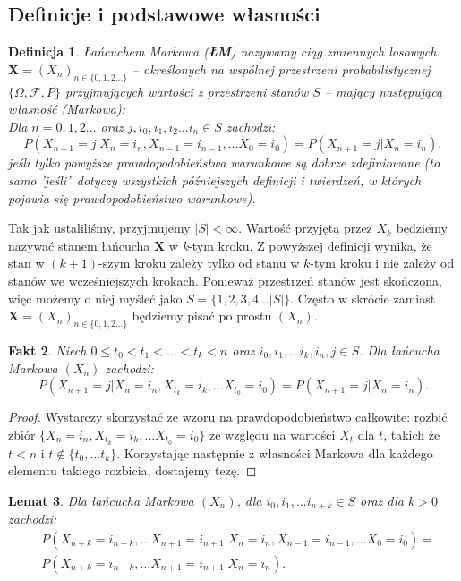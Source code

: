 \documentclass[a4paper]{article}
\theoremstyle{defn}
\newtheorem{defn}{Definicja}[subsection]
\theoremstyle{theorem}
\theoremstyle{lemma}
\newtheorem{lemma}[defn]{Lemat}
\theoremstyle{cor}
\theoremstyle{fact}
\newtheorem{fact}[defn]{Fakt}
\begin{document}
\subsection{Definicje i podstawowe własności}
\label{sect2.1}
\begin{defn}\label{defn2.1.1}
\textit{Łańcuchem Markowa} (\textbf{ŁM}) nazywamy ciąg zmiennych losowych $\boldsymbol{X} = (X_n)_{n \in \{0,1,2...\}}$ – określonych na wspólnej przestrzeni probabilistycznej $\{\Omega, \mathcal{F}, P\}$ przyjmujących wartości z przestrzeni stanów $S$ – mający następującą własność (Markowa):\\
Dla $n = 0, 1, 2...$ oraz $j, i_0, i_1, i_2 ... i_n \in S$ zachodzi: $$P(X_{n+1} = j | X_n = i_n, X_{n-1} = i_{n-1}, ... X_0 = i_0) = P(X_{n+1} = j| X_{n} = i_n),$$
jeśli tylko powyższe prawdopodobieństwa warunkowe są dobrze zdefiniowane (to samo 'jeśli'\, dotyczy wszystkich późniejszych definicji i twierdzeń, w których pojawia się prawdopodobieństwo warunkowe).
\end{defn}
Tak jak ustaliliśmy, przyjmujemy $|S| <\infty$. Wartość przyjętą przez $X_k$ będziemy nazywać stanem łańcucha $\boldsymbol{X}$ w \textit{k}-tym kroku. Z powyższej definicji wynika, że stan w $(k+1)$-szym kroku zależy tylko od stanu w $k$-tym kroku i nie zależy od stanów we wcześniejszych krokach. Ponieważ przestrzeń stanów jest skończona, więc możemy o niej myśleć jako $S = \{1,2,3,4...|S|\}$. Często w skrócie zamiast $\boldsymbol{X} = (X_n)_{n \in \{0,1,2...\}}$ będziemy pisać po prostu $(X_n)$.
\begin{fact}\label{fact2.1.2}
Niech $0 \leq t_0 < t_1 < ... < t_k < n$ oraz $i_0, i_1, ... i_k, i_n, j \in S$. Dla łańcucha Markowa $(X_n)$ zachodzi:
$$P(X_{n+1} = j | X_n = i_n, X_{t_{k}} = i_k, ... X_{t_0} = i_0) = P(X_{n+1} = j| X_{n} = i_n).$$
\end{fact}
\begin{proof}
Wystarczy skorzystać ze wzoru na prawdopodobieństwo całkowite: rozbić zbiór $\{X_n = i_n, X_{t_{k}} = i_k, ... X_{t_0} = i_0\}$ ze względu na wartości $X_t$ dla $t$, takich że $t < n$ i $t \notin \{t_0, ... t_k\}$. Korzystając następnie z własności Markowa dla każdego elementu takiego rozbicia, dostajemy tezę.
\end{proof}
\begin{lemma}\label{lemma2.1.3}
Dla łańcucha Markowa $(X_n)$, dla $i_0, i_1, ... i_{n+k} \in S$ oraz dla $k > 0$ zachodzi:
\begin{align*}
&P(X_{n+k} = i_{n+k}, ...X_{n+1} = i_{n+1} | X_n = i_n, X_{n-1} = i_{n-1}, ... X_0 = i_0)=\\
&P(X_{n+k} = i_{n+k}, ...X_{n+1} = i_{n+1} | X_n = i_n).
\end{align*}
\end{lemma}
\end{document}
